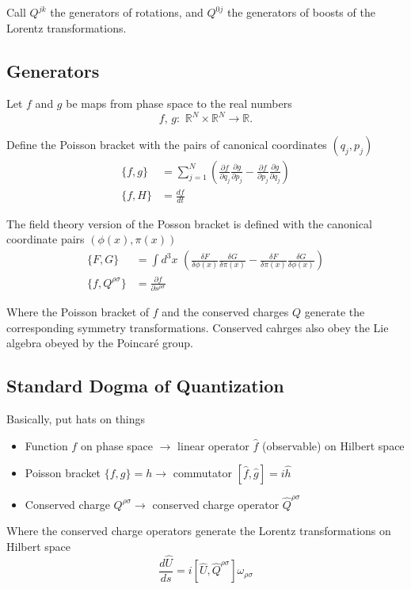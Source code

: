 \noindent Call $Q^{jk}$ the generators of rotations, and $Q^{0j}$ the generators of boosts of the Lorentz transformations.

\subsection*{Generators}

\noindent Let $f$ and $g$ be maps from phase space to the real numbers 
\begin{equation}
f, \, g: \,\, \mathbb{R}^N \times \mathbb{R}^N \rightarrow \mathbb{R}.
\end{equation}

\noindent Define the Poisson bracket with the pairs of canonical coordinates $(q_j, p_j)$
\begin{align}
\{f,g\} &= \sum_{j=1}^N \left( \frac{\partial f}{\partial q_j} \frac{\partial g}{\partial p_j} - \frac{\partial f}{\partial p_j} \frac{\partial g}{\partial q_j} \right) \\
\{f, H \} &= \frac{d f}{d t}
\end{align}

\noindent The field theory version of the Posson bracket is defined with the canonical coordinate pairs $(\phi(x), \pi(x))$
\begin{align}
\{F, G\} &= \int d^3x \,\, \left( \frac{\delta F}{\delta \phi(x)} \frac{\delta G}{\delta \pi(x)} - \frac{\delta F}{\delta \pi(x)} \frac{\delta G}{\delta \phi(x)} \right) \\
\{f, Q^{\rho \sigma}\} &= \frac{\partial f}{\partial s^{\rho \sigma}}
\end{align}

\noindent Where the Poisson bracket of $f$ and the conserved charges $Q$ generate the corresponding symmetry transformations. Conserved cahrges also obey the Lie algebra obeyed by the Poincar\'e group.

\subsection*{Standard Dogma of Quantization}

\noindent Basically, put hats on things

\begin{itemize}
\item Function $f$ on phase space $\rightarrow$ linear operator $\hat{f}$ (observable) on Hilbert space \\
\item Poisson bracket $\{ f,g \} = h \rightarrow$ commutator $[\hat{f}, \hat{g}] = i \hat{h}$ \\
\item Conserved charge $Q^{\rho \sigma} \rightarrow$ conserved charge operator $\hat{Q}^{\rho \sigma}$
\end{itemize}

\noindent Where the conserved charge operators generate the Lorentz transformations on Hilbert space
\begin{equation}
\frac{d \hat{U}}{d s} = i [\hat{U}, \hat{Q}^{\rho \sigma}] \omega_{\rho \sigma}
\end{equation}